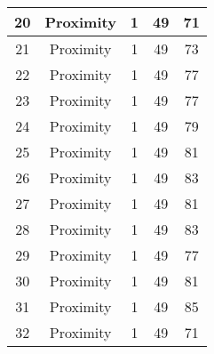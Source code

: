 \documentclass[results.tex]{subfiles}
\begin{document}
\begin{center}
\begin{tabular}{| c || c | c | c | c |}
            \hline
            20                      & Proximity                    & 1                      & 49                      & 71                   \\
            \hline
            21                      & Proximity                    & 1                      & 49                      & 73                   \\
            \hline
            22                      & Proximity                    & 1                      & 49                      & 77                   \\
            \hline
            23                      & Proximity                    & 1                      & 49                      & 77                   \\
            \hline
            24                      & Proximity                    & 1                      & 49                      & 79                   \\
            \hline
            25                      & Proximity                    & 1                      & 49                      & 81                   \\
            \hline
            26                      & Proximity                    & 1                      & 49                      & 83                   \\
            \hline
            27                      & Proximity                    & 1                      & 49                      & 81                   \\
            \hline
            28                      & Proximity                    & 1                      & 49                      & 83                   \\
            \hline
            29                      & Proximity                    & 1                      & 49                      & 77                   \\
            \hline
            30                      & Proximity                    & 1                      & 49                      & 81                   \\
            \hline
            31                      & Proximity                    & 1                      & 49                      & 85                   \\
            \hline
            32                      & Proximity                    & 1                      & 49                      & 71                   \\

\end{tabular}
\end{center}
\end{document}
